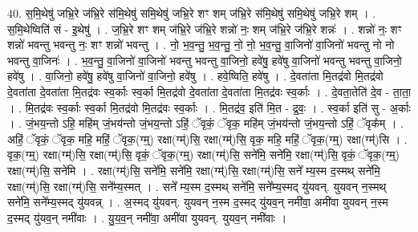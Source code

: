 \documentclass[17pt]{extarticle}
\begin{document}
40. स॒मि॒थेषु॑ जभ्रि॒रे ज॑भ्रि॒रे स॑मि॒थेषु॑ समि॒थेषु॑ जभ्रि॒रे शꣳ शम् ज॑भ्रि॒रे स॑मि॒थेषु॑ समि॒थेषु॑ जभ्रि॒रे शम् । . स॒मि॒थेष्विति॑ सं - इ॒थेषु॑ । . ज॒भ्रि॒रे शꣳ शम् ज॑भ्रि॒रे ज॑भ्रि॒रे शन्नो॑ नः॒ शम् ज॑भ्रि॒रे ज॑भ्रि॒रे शन्नः॑ । . शन्नो॑ नः॒ शꣳ शन्नो॑ भवन्तु भवन्तु नः॒ शꣳ शन्नो॑ भवन्तु । . नो॒ भ॒व॒न्तु॒ भ॒व॒न्तु॒ नो॒ नो॒ भ॒व॒न्तु॒ वा॒जिनो॑ वा॒जिनो॑ भवन्तु नो नो भवन्तु वा॒जिनः॑ । . भ॒व॒न्तु॒ वा॒जिनो॑ वा॒जिनो॑ भवन्तु भवन्तु वा॒जिनो॒ हवे॑षु॒ हवे॑षु वा॒जिनो॑ भवन्तु भवन्तु वा॒जिनो॒ हवे॑षु । . वा॒जिनो॒ हवे॑षु॒ हवे॑षु वा॒जिनो॑ वा॒जिनो॒ हवे॑षु । . हवे॒ष्विति॒ हवे॑षु । . दे॒वता॑ता मि॒तद्र॑वो मि॒तद्र॑वो दे॒वता॑ता दे॒वता॑ता मि॒तद्र॑वः स्व॒र्काः स्व॒र्का मि॒तद्र॑वो दे॒वता॑ता दे॒वता॑ता मि॒तद्र॑वः स्व॒र्काः । . दे॒वता॒तेति॑ दे॒व - ता॒ता॒ । . मि॒तद्र॑वः स्व॒र्काः स्व॒र्का मि॒तद्र॑वो मि॒तद्र॑वः स्व॒र्काः । . मि॒तद्र॑व॒ इति॑ मि॒त - द्र॒वः॒ । . स्व॒र्का इति॑ सु - अ॒र्काः । . जं॒भय॒न्तो ऽहि॒ महि॑म् जं॒भय॑न्तो जं॒भय॒न्तो ऽहिं॒ ॅवृकं॒ ॅवृक॒ महि॑म् जं॒भय॑न्तो जं॒भय॒न्तो ऽहिं॒ ॅवृक᳚म् । . अहिं॒ ॅवृकं॒ ॅवृक॒ महि॒ महिं॒ ॅवृक॒(ग्म्॒) रक्षा(ग्म्॑)सि॒ रक्षा(ग्म्॑)सि॒ वृक॒ महि॒ महिं॒ ॅवृक॒(ग्म्॒) रक्षा(ग्म्॑)सि । . वृक॒(ग्म्॒) रक्षा(ग्म्॑)सि॒ रक्षा(ग्म्॑)सि॒ वृकं॒ ॅवृक॒(ग्म्॒) रक्षा(ग्म्॑)सि॒ सने॑मि॒ सने॑मि॒ रक्षा(ग्म्॑)सि॒ वृकं॒ ॅवृक॒(ग्म्॒) रक्षा(ग्म्॑)सि॒ सने॑मि । . रक्षा(ग्म्॑)सि॒ सने॑मि॒ सने॑मि॒ रक्षा(ग्म्॑)सि॒ रक्षा(ग्म्॑)सि॒ सने᳚ म्य॒स्म द॒स्मथ् सने॑मि॒ रक्षा(ग्म्॑)सि॒ रक्षा(ग्म्॑)सि॒ सने᳚म्य॒स्मत् । . सने᳚ म्य॒स्म द॒स्मथ् सने॑मि॒ सने᳚म्य॒स्मद् यु॑यवन्. युयवन् न॒स्मथ् सने॑मि॒ सने᳚म्य॒स्मद् यु॑यवन्न् । . अ॒स्मद् यु॑यवन्. युयवन् न॒स्म द॒स्मद् यु॑यव॒न् नमी॑वा॒ अमी॑वा युयवन् न॒स्म द॒स्मद् यु॑यव॒न् नमी॑वाः । . यु॒य॒व॒न् नमी॑वा॒ अमी॑वा युयवन्. युयव॒न् नमी॑वाः । \newline
\pagebreak
{}
\end{document}
